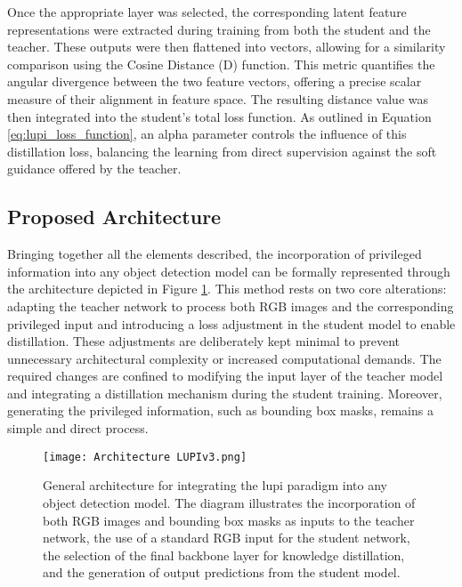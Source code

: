 Once the appropriate layer was selected, the corresponding latent feature representations were extracted during training from both the student and the teacher. These outputs were then flattened into vectors, allowing for a similarity comparison using the Cosine Distance (\gls{D}) function. This metric quantifies the angular divergence between the two feature vectors, offering a precise scalar measure of their alignment in feature space. The resulting distance value was then integrated into the student’s total loss function. As outlined in Equation \ref{eq:lupi_loss_function}, an \gls{alpha} parameter controls the influence of this distillation loss, balancing the learning from direct supervision against the soft guidance offered by the teacher.

\subsection{Proposed Architecture}
\label{subsec:4_architecture}

Bringing together all the elements described, the incorporation of privileged information into any object detection model can be formally represented through the architecture depicted in Figure \ref{fig:lupi_architecture}. This method rests on two core alterations: adapting the teacher network to process both RGB images and the corresponding privileged input and introducing a loss adjustment in the student model to enable distillation. These adjustments are deliberately kept minimal to prevent unnecessary architectural complexity or increased computational demands. The required changes are confined to modifying the input layer of the teacher model and integrating a distillation mechanism during the student training. Moreover, generating the privileged information, such as bounding box masks, remains a simple and direct process.
\begin{figure}[ht]
    \centering
    \texttt{[image: Architecture LUPIv3.png]}
    \caption{General architecture for integrating the \gls{lupi} paradigm into any object detection model. The diagram illustrates the incorporation of both RGB images and bounding box masks as inputs to the teacher network, the use of a standard RGB input for the student network, the selection of the final backbone layer for knowledge distillation, and the generation of output predictions from the student model.}
    \label{fig:lupi_architecture}%
\end{figure}

